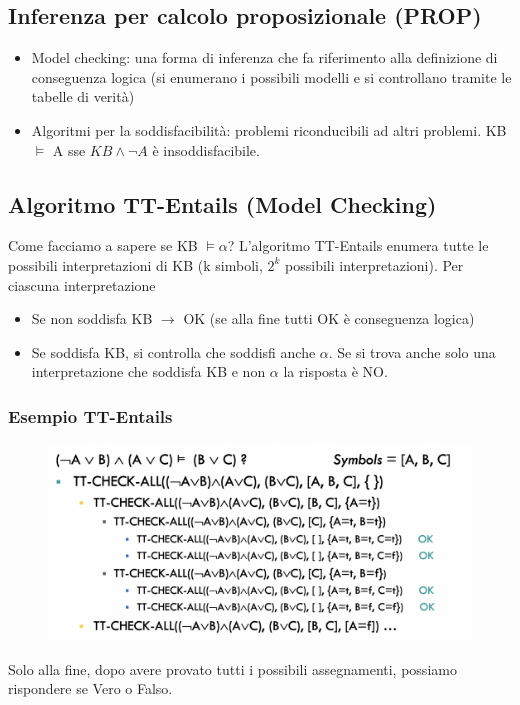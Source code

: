 \documentclass{article}
\begin{document}
\subsection{Inferenza per calcolo proposizionale (PROP)}
\begin{itemize}
    \item Model checking: una forma di inferenza che fa riferimento alla definizione di conseguenza logica (si enumerano i possibili modelli e si controllano tramite le tabelle di verità)
    \item Algoritmi per la soddisfacibilità: problemi riconducibili ad altri problemi. \newline KB $\models$ A sse $KB\land \neg A$ è insoddisfacibile.
\end{itemize}

\subsection{Algoritmo TT-Entails (Model Checking)}
Come facciamo a sapere se KB $\models \alpha$? L'algoritmo TT-Entails enumera tutte le possibili interpretazioni di KB (k simboli, $2^k$ possibili interpretazioni). Per ciascuna interpretazione 
\begin{itemize}
    \item Se non soddisfa KB $\to$ OK (se alla fine tutti OK è conseguenza logica)
    \item Se soddisfa KB, si controlla che soddisfi anche $\alpha$. Se si trova anche solo una interpretazione che soddisfa KB e non $\alpha$ la risposta è NO.
\end{itemize} 

\subsubsection{Esempio TT-Entails}
\begin{figure}[H]
\centering
\includegraphics[scale=0.4]{Images/ttentailscheck.png}
\end{figure}
Solo alla fine, dopo avere provato tutti i possibili assegnamenti, possiamo rispondere se Vero o Falso.
\end{document}

